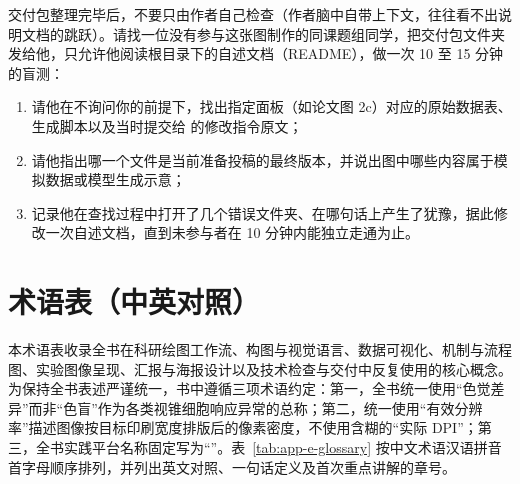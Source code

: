 交付包整理完毕后，不要只由作者自己检查（作者脑中自带上下文，往往看不出说明文档的跳跃）。请找一位没有参与这张图制作的同课题组同学，把交付包文件夹发给他，只允许他阅读根目录下的自述文档（README），做一次 10 至 15 分钟的盲测：

\begin{enumerate}
  \item 请他在不询问你的前提下，找出指定面板（如论文图 2c）对应的原始数据表、生成脚本以及当时提交给 \scidraw{} 的修改指令原文；
  \item 请他指出哪一个文件是当前准备投稿的最终版本，并说出图中哪些内容属于模拟数据或模型生成示意；
  \item 记录他在查找过程中打开了几个错误文件夹、在哪句话上产生了犹豫，据此修改一次自述文档，直到未参与者在 10 分钟内能独立走通为止。
\end{enumerate}

\chapter{术语表（中英对照）}
\label{app:glossary}

本术语表收录全书在科研绘图工作流、构图与视觉语言、数据可视化、机制与流程图、实验图像呈现、汇报与海报设计以及技术检查与交付中反复使用的核心概念。为保持全书表述严谨统一，书中遵循三项术语约定：第一，全书统一使用“色觉差异”而非“色盲”作为各类视锥细胞响应异常的总称；第二，统一使用“有效分辨率”描述图像按目标印刷宽度排版后的像素密度，不使用含糊的“实际 DPI”；第三，全书实践平台名称固定写为“\scidraw{}”。表~\ref{tab:app-e-glossary} 按中文术语汉语拼音首字母顺序排列，并列出英文对照、一句话定义及首次重点讲解的章号。

